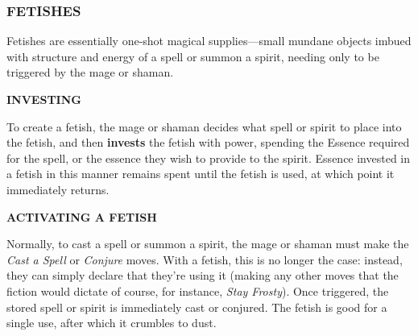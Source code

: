 \documentclass[oneside,10pt]{article}
\begin{document}
\begin{multicols}{2}
  \subsubsection{FETISHES}
  Fetishes are essentially one-shot magical supplies—small mundane
  objects imbued with structure and energy of a spell or summon a
  spirit, needing only to be triggered by the mage or shaman.

  \textbf{INVESTING}

  To create a fetish, the mage or shaman decides what spell or spirit
  to place into the fetish, and then \textbf{invests} the fetish with
  power, spending the Essence required for the spell, or the essence
  they wish to provide to the spirit. Essence invested in a fetish in
  this manner remains spent until the fetish is used, at which point
  it immediately returns.

  \textbf{ACTIVATING A FETISH}

  Normally, to cast a spell or summon a spirit, the mage or shaman
  must make the \textit{Cast a Spell} or \textit{Conjure} moves. With
  a fetish, this is no longer the case: instead, they can simply
  declare that they’re using it (making any other moves that the
  fiction would dictate of course, for instance, \textit{Stay
    Frosty}).  Once triggered, the stored spell or spirit is
  immediately cast or conjured. The fetish is good for a single use,
  after which it crumbles to dust.

\end{multicols}
\end{document}
